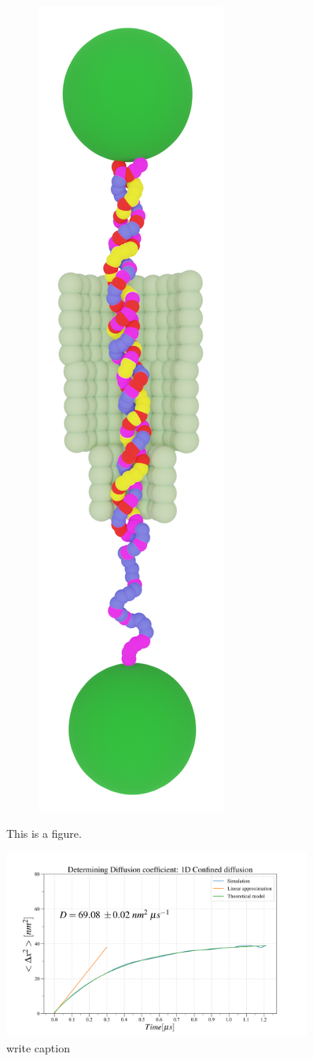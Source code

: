 \begin{figure}[ht!]
\begin{centering}
\begin{subfigure}[t]{\dimexpr.21\linewidth-1.3em\relax}
  \centering
  \vspace{-0.6cm}
  \includegraphics[width=.35\linewidth,valign=t]{Figures/Rotaxane-70.png}
  \end{subfigure}
  \label{fig:test}
  \end{centering}
  \caption{This is a figure.}

\end{figure}



\begin{figure}
\begin{center}
  \includegraphics[width=0.90\textwidth]{Figures/MR-100-diff.png}
  \caption{write caption}
\end{center}
\end{figure}
